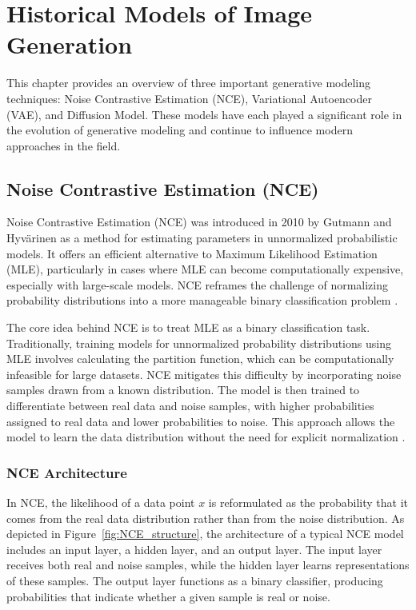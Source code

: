 \chapter{Historical Models of Image Generation}
This chapter provides an overview of three important generative modeling techniques: Noise Contrastive Estimation (NCE), Variational Autoencoder (VAE), and Diffusion Model. These models have each played a significant role in the evolution of generative modeling and continue to influence modern approaches in the field.

\section{Noise Contrastive Estimation (NCE)}

Noise Contrastive Estimation (NCE) was introduced in 2010 by Gutmann and Hyvärinen as a method for estimating parameters in unnormalized probabilistic models. It offers an efficient alternative to Maximum Likelihood Estimation (MLE), particularly in cases where MLE can become computationally expensive, especially with large-scale models. NCE reframes the challenge of normalizing probability distributions into a more manageable binary classification problem \citep{10.48550/arxiv.1711.00658}. 

The core idea behind NCE is to treat MLE as a binary classification task. Traditionally, training models for unnormalized probability distributions using MLE involves calculating the partition function, which can be computationally infeasible for large datasets. NCE mitigates this difficulty by incorporating noise samples drawn from a known distribution. The model is then trained to differentiate between real data and noise samples, with higher probabilities assigned to real data and lower probabilities to noise. This approach allows the model to learn the data distribution without the need for explicit normalization \citep{10.48550/arxiv.2110.11271}.

\subsection{NCE Architecture}
In NCE, the likelihood of a data point \( x \) is reformulated as the probability that it comes from the real data distribution rather than from the noise distribution. As depicted in Figure~\ref{fig:NCE_structure}, the architecture of a typical NCE model includes an input layer, a hidden layer, and an output layer. The input layer receives both real and noise samples, while the hidden layer learns representations of these samples. The output layer functions as a binary classifier, producing probabilities that indicate whether a given sample is real or noise.


